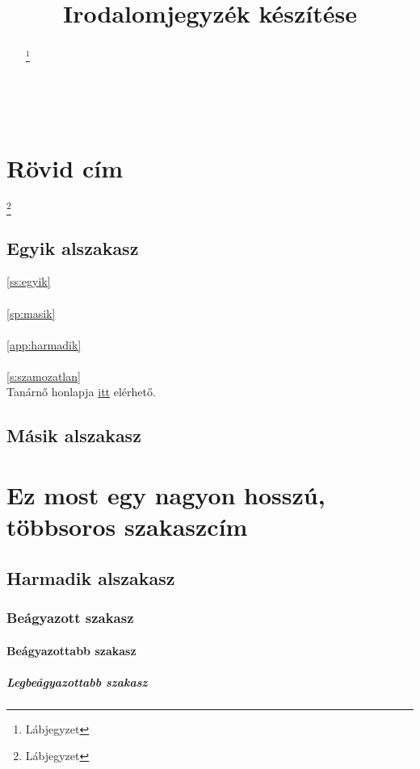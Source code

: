 \documentclass[twoside,12pt]{article}
\begin{document}
\title{Irodalomjegyzék készítése}
\maketitle
\pagestyle{fancy}
\clearpage
\begin{abstract}
\hulipsum[1-2]
\footnote{Lábjegyzet}
\end{abstract}
\clearpage
{}
\tableofcontents
\clearpage
~
\clearpage
{}
\section[1. szakasz]{Rövid cím}
\footnote{Lábjegyzet}
\subsection{Egyik alszakasz}
\autoref{ss:egyik}\\
\\
\autoref{sp:masik}\\
\\
\autoref{app:harmadik}\\
\\
\ref{s:szamozatlan}\\
Tanárnő honlapja \href{https://web.uni-miskolc.hu/~viktoria.vadon/}{itt} elérhető.\\
\hulipsum[3-7]
\cite{abrharber03}
\subsection{Másik alszakasz}
\hulipsum[8-10]
\cite{lamport94}
\label{ss:egyik}
\hulipsum[11]
\cite{knuth84}
\section[2. szakasz]{Ez most egy nagyon hosszú, többsoros szakaszcím}
\subsection{Harmadik alszakasz}
\hulipsum[12-14]
\subsubsection{Beágyazott szakasz}
\hulipsum[15-17]
\cite{abrharber03,lamport94}
\paragraph{Beágyazottabb szakasz}
\hulipsum[18-20]
\subparagraph{Legbeágyazottabb szakasz}
\label{sp:masik}
\hulipsum[21-23]
\cite{bujfaz,lamport94}
\end{document}
